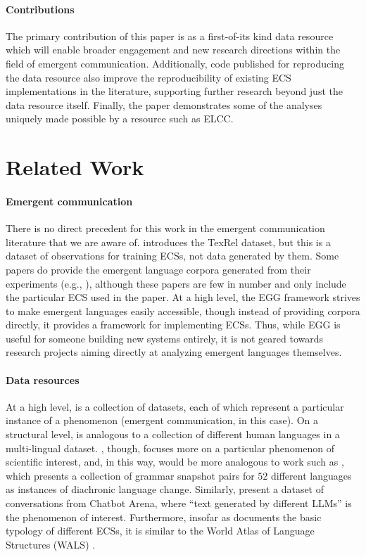 \paragraph{Contributions}
The primary contribution of this paper is as a first-of-its kind data resource which will enable broader engagement and new research directions within the field of emergent communication.
Additionally, code published for reproducing the data resource also improve the reproducibility of existing ECS implementations in the literature, supporting further research beyond just the data resource itself.
Finally, the paper demonstrates some of the analyses uniquely made possible by a resource such as ELCC\@.

\section{Related Work}
\unskip\label{elcc:sec:related-work}

\paragraph{Emergent communication}
There is no direct precedent for this work in the emergent communication literature that we are aware of.
\citet{perkins2021texrel} introduces the TexRel dataset, but this is a dataset of observations for training ECSs, not data generated by them.
Some papers do provide the emergent language corpora generated from their experiments (e.g., \citet{yao2022linking}), although these papers are few in number and only include the particular ECS used in the paper.
At a high level, the EGG framework \citep{egg} strives to make emergent languages easily accessible,
  though instead of providing corpora directly, it provides a framework for implementing ECSs.
Thus, while EGG is useful for someone building new systems entirely, it is not geared towards research projects aiming directly at analyzing emergent languages themselves.

\paragraph{Data resources}
At a high level, \theLib{} is a collection of datasets, each of which represent a particular instance of a phenomenon (emergent communication, in this case).
On a structural level, \theLib{} is analogous to a collection of different human languages in a multi-lingual dataset.
\theLib{}, though, focuses more on a particular phenomenon of scientific interest, and, in this way, would be more analogous to work such as \citet{blum2023grammars}, which presents a collection of grammar snapshot pairs for $52$ different languages as instances of diachronic language change.
Similarly, \citet{zheng2024judging} present a dataset of conversations from Chatbot Arena, where ``text generated by different LLMs'' is the phenomenon of interest.
Furthermore, insofar as \theLib{} documents the basic typology of different ECSs, it is similar to the World Atlas of Language Structures (WALS) \citep{wals}.


